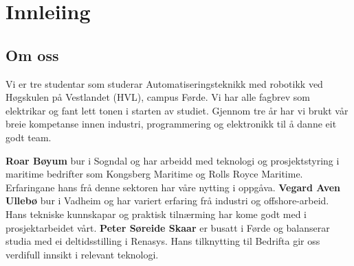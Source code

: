 \chapter{Innleiing}
\thispagestyle{fancy}

\section{Om oss}

Vi er tre studentar som studerar Automatiseringsteknikk med robotikk ved Høgskulen på Vestlandet (\gls{HVL}), campus Førde.
Vi har alle fagbrev som elektrikar og fant lett tonen i starten av studiet.
Gjennom tre år har vi brukt vår breie kompetanse innen industri, programmering og elektronikk
til å danne eit godt team.

\textbf{Roar Bøyum} bur i Sogndal og har arbeidd med teknologi og prosjektstyring i maritime bedrifter som
Kongsberg Maritime og Rolls Royce Maritime. Erfaringane hans frå denne sektoren har våre nytting i oppgåva.
\newline \newline
\textbf{Vegard Aven Ullebø} bur i Vadheim og har variert erfaring frå industri og offshore-arbeid. 
Hans tekniske kunnskapar og praktisk tilnærming har kome godt med i prosjektarbeidet vårt. 
\newline \newline
\textbf{Peter Søreide Skaar} er busatt i Førde og balanserar studia med ei deltidsstilling i Renasys. Hans tilknytting til Bedrifta
gir oss verdifull innsikt i relevant teknologi. 

\newpage


